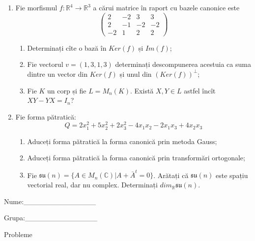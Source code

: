 \documentclass{article}
\begin{document}
\begin{enumerate}
 \item Fie morfismul $f:\mathbb{R}^4 \to \mathbb{R}^3$ a cărui matrice în raport cu bazele canonice este
$$\begin{pmatrix}
2&-2&3&3\\
2&-1&-2&-2\\
-2&1&2&2
\end{pmatrix}$$

\begin{enumerate}
\item Determinați cîte o bază în $Ker(f)$ și $Im(f)$;
\item Fie vectorul $v=(1,3,1,3)$ determinați descompunerea acestuia ca suma dintre un vector din $Ker(f)$ și unul din $(Ker(f))^\perp$;
\item Fie $K$ un corp și fie $L=M_n(K)$. Există $X,Y \in L$ astfel încît $XY-YX=I_n$?  
\end{enumerate}
\item Fie forma pătratică:
$$Q= 2x_1^2+5x_2^2+2x_3^2-4x_1x_2-2x_1x_3+4x_2x_3$$

\begin{enumerate}
\item Aduceți forma pătratică la forma canonică prin metoda Gauss;
\item Aduceți forma pătratică la forma canonică prin transformări ortogonale;
\item Fie $\mathfrak{su}(n)=\{ A \in M_n(\mathbb{C}) | A+\bar{A}^t=0\}$. Arătați că $\mathfrak{su}(n)$ este spațiu vectorial real, dar nu complex.
Determinați $dim_{\mathbb{R}}\mathfrak{su}(n)$.
\end{enumerate}
\end{enumerate}
\newpage
\begin{flushright}
Nume:\_\_\_\_\_\_\_\_\_\_\_\_\_\_
 
 
Grupa:\_\_\_\_\_\_\_\_\_\_\_\_\_\_
\end{flushright}
\begin{center}
\vspace{2cm}
{\Large Probleme}
\vspace{2cm}
\end{center}
\end{document}
